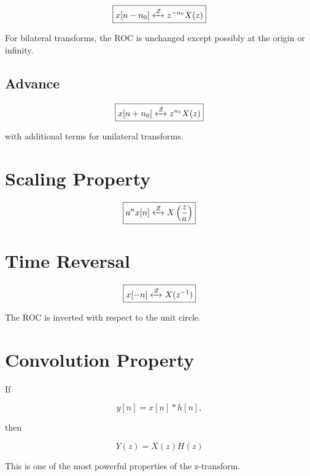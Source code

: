 \[
\boxed{
x[n-n_0]
\xleftrightarrow{\mathcal{Z}}
z^{-n_0}X(z)
}
\]

For bilateral transforms, the ROC is unchanged except possibly at the origin or infinity.


\subsection{Advance}

\[
\boxed{
x[n+n_0]
\xleftrightarrow{\mathcal{Z}}
z^{n_0}X(z)
}
\]

with additional terms for unilateral transforms.


\section{Scaling Property}

\[
\boxed{
a^n x[n]
\xleftrightarrow{\mathcal{Z}}
X\left(\frac{z}{a}\right)
}
\]


\section{Time Reversal}

\[
\boxed{
x[-n]
\xleftrightarrow{\mathcal{Z}}
X(z^{-1})
}
\]

The ROC is inverted with respect to the unit circle.


\section{Convolution Property}

If

\[
y[n]=x[n]*h[n],
\]

then

\[
\boxed{
Y(z)=X(z)H(z)
}
\]

This is one of the most powerful properties of the z-transform.


